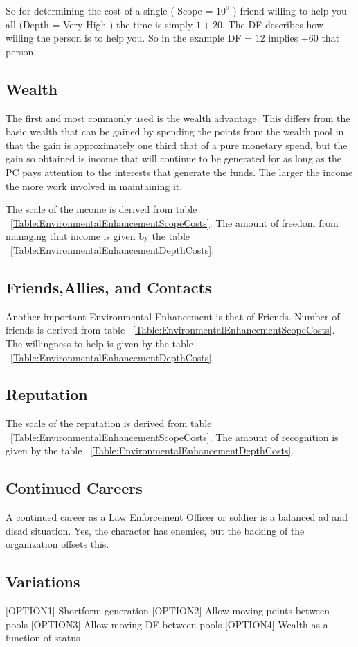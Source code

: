 So for determining the cost of a single ( Scope = $ 10^0$ ) friend willing to help you all (Depth = Very High ) the
time is simply $ 1 + 20 $. The DF describes how willing the person is to
help you. So in the example DF = 12 implies +60%
that person.

\subsection{Wealth}

The first and most commonly used is the wealth advantage. This differs
from the basic wealth that can be gained by spending the points from the
wealth pool in that the gain is approximately one third that of a pure
monetary spend, but the gain so obtained is income that will continue to
be generated for as long as the PC pays attention to the interests that
generate the funds. The larger the income the more work involved in
maintaining it.

The scale of the income is derived from table ~\ref{Table:EnvironmentalEnhancementScopeCosts}. The amount of
freedom from managing that income is given by the table
~\ref{Table:EnvironmentalEnhancementDepthCosts}.

\subsection{Friends,Allies, and Contacts}

Another important Environmental Enhancement is that of Friends. 
Number of friends is derived from table
~\ref{Table:EnvironmentalEnhancementScopeCosts}. The willingness to help 
is given by the table
~\ref{Table:EnvironmentalEnhancementDepthCosts}.

\subsection{Reputation}

The scale of the reputation is derived from table ~\ref{Table:EnvironmentalEnhancementScopeCosts}. The amount of
recognition is given by the table ~\ref{Table:EnvironmentalEnhancementDepthCosts}.

\subsection{Continued Careers}

A continued career as a Law Enforcement Officer or soldier is a
balanced ad and disad situation. Yes, the character has enemies, but the
backing of the organization offsets this.

\subsection{Variations}

[OPTION1] Shortform generation
[OPTION2] Allow moving points between pools
[OPTION3] Allow moving DF between pools
[OPTION4] Wealth as a function of status


